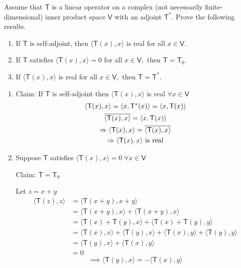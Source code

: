 Assume that $\mathsf{T}$ is a linear operator on a complex (not
necessarily finite-dimensional) inner product space $\mathsf{V}$ with
an adjoint $\mathsf{T}^*.$ Prove the following results.
\begin{enumerate}
\item If $\mathsf{T}$ is self-adjoint, then $\langle
  \mathsf{T}(x),x\rangle$ is real for all $x \in \mathsf{V}.$
\item If $\mathsf{T}$ satisfies $\langle \mathsf{T}(x),x \rangle = 0$
  for all $x \in \mathsf{V},$ then $\mathsf{T} = \mathsf{T}_0.$\\
\item If $\langle \mathsf{T}(x),x \rangle$ is real for all $x \in
  \mathsf{V},$ then $\mathsf{T} = \mathsf{T}^*.$
\end{enumerate}
\begin{enumerate}
\item Claim: If $\mathsf{T}$ is self-adjoint then $\langle
  \mathsf{T}(x),x \rangle$ is real $\forall x \in \mathsf{V}$
\begin{gather}
\langle \mathsf{T}(x),x \rangle = \langle x, \mathsf{T}^*(x) \rangle =
\langle x, \mathsf{T}(x) \rangle\\
\overline{\langle \mathsf{T}(x),x \rangle} = \langle x, \mathsf{T}(x)
\rangle\\
\implies \langle \mathsf{T}(x),x \rangle = \overline{\langle
  \mathsf{T}(x),x \rangle}\\
\notag \implies \langle\mathsf{T}(x), x \rangle \text{ is real}
\end{gather}
\item Suppose $\mathsf{T}$ satisfies $\langle \mathsf{T}(x),x \rangle =0 \;
\forall x \in \mathsf{V}$ 

Claim: $\mathsf{T} = \mathsf{T}_0$

Let $z = x + y$
\begin{align}
\langle \mathsf{T}(z),z\rangle &= \langle \mathsf{T}(x+y),x+y\rangle
\\
&= \langle \mathsf{T}(x+y),x\rangle + \langle
\mathsf{T}(x+y),x \rangle\\
 &= \langle\mathsf{T}(x)+\mathsf{T}(y),x\rangle + \langle
 \mathsf{T}(x)+\mathsf{T}(y),y\rangle \\
 &= \langle \mathsf{T}(x),x \rangle + \langle \mathsf{T}(y),x \rangle +
 \langle \mathsf{T}(x),y\rangle + \langle \mathsf{T}(y),y\rangle\\
 &= \langle \mathsf{T}(y),x \rangle + \langle \mathsf{T}(x),y\rangle \\
 &= 0
 \end{align}
 \begin{equation}
 \implies \langle \mathsf{T}(y),x \rangle =  -\langle \mathsf{T}(x),y\rangle
 \end{equation}


\end{enumerate}
